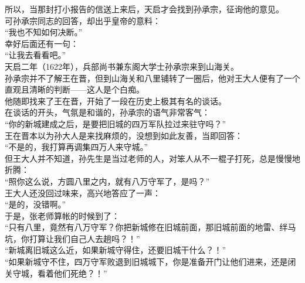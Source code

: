 \begin{multicols}{\theparacolNo}
所以，当那封打小报告的信送上来后，天启才会找到孙承宗，征询他的意见。\\

可孙承宗同志的回答，却出乎皇帝的意料：\\

“我也不知如何决断。”\\

幸好后面还有一句：\\

“让我去看看吧。”\\

天启二年（1622年），兵部尚书兼东阁大学士孙承宗来到山海关。\\

孙承宗并不了解王在晋，但到山海关和八里铺转了一圈后，他对王大人便有了一个直观且清晰的判断——这人是个白痴。\\

他随即找来了王在晋，开始了一段在历史上极其有名的谈话。\\

在谈话的开头，气氛是和谐的，孙承宗的语气非常客气：\\

“你的新城建成之后，是要把旧城的四万军队拉过来驻守吗？”\\

王在晋本以为孙大人是来找麻烦的，没想到如此友善，当即回答：\\

“不是的，我打算再调集四万人来守城。”\\

但王大人并不知道，孙先生是当过老师的人，对笨人从不一棍子打死，总是慢慢地折腾：\\

“照你这么说，方圆八里之内，就有八万守军了，是吗？”\\

王大人还没回过味来，高兴地答应了一声：\\

“是的，没错啊。”\\

于是，张老师算帐的时候到了：\\

“只有八里，竟然有八万守军？你把新城修在旧城前面，那旧城前面的地雷、绊马坑，你打算让我们自己人去趟吗？！”\\

“新城离旧城这么近，如果新城守得住，还要旧城干什么？！”\\

“如果新城守不住，四万守军败退到旧城城下，你是准备开门让他们进来，还是闭关守城，看着他们死绝？！”\\


\end{multicols}
